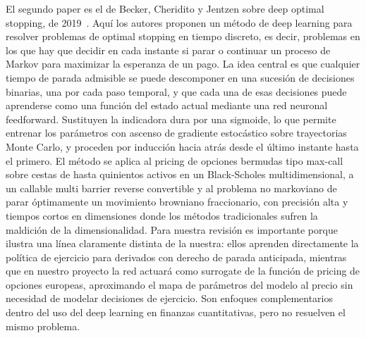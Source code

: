 \documentclass[11pt,a4paper]{article}
\begin{document}
El segundo paper es el de Becker, Cheridito y Jentzen sobre deep optimal stopping, de 2019~\cite{becker2019}. Aquí los autores proponen un método de deep learning para resolver problemas de optimal stopping en tiempo discreto, es decir, problemas en los que hay que decidir en cada instante si parar o continuar un proceso de Markov para maximizar la esperanza de un pago. La idea central es que cualquier tiempo de parada admisible se puede descomponer en una sucesión de decisiones binarias, una por cada paso temporal, y que cada una de esas decisiones puede aprenderse como una función del estado actual mediante una red neuronal feedforward. Sustituyen la indicadora dura por una sigmoide, lo que permite entrenar los parámetros con ascenso de gradiente estocástico sobre trayectorias Monte Carlo, y proceden por inducción hacia atrás desde el último instante hasta el primero. El método se aplica al pricing de opciones bermudas tipo max-call sobre cestas de hasta quinientos activos en un Black-Scholes multidimensional, a un callable multi barrier reverse convertible y al problema no markoviano de parar óptimamente un movimiento browniano fraccionario, con precisión alta y tiempos cortos en dimensiones donde los métodos tradicionales sufren la maldición de la dimensionalidad. Para nuestra revisión es importante porque ilustra una línea claramente distinta de la nuestra: ellos aprenden directamente la política de ejercicio para derivados con derecho de parada anticipada, mientras que en nuestro proyecto la red actuará como surrogate de la función de pricing de opciones europeas, aproximando el mapa de parámetros del modelo al precio sin necesidad de modelar decisiones de ejercicio. Son enfoques complementarios dentro del uso del deep learning en finanzas cuantitativas, pero no resuelven el mismo problema.
\end{document}
